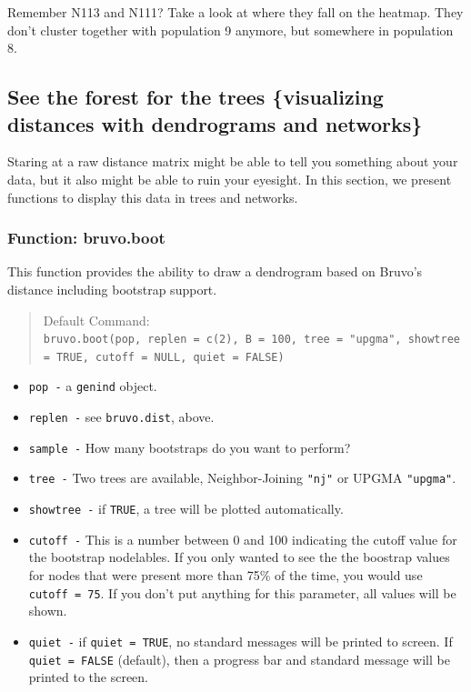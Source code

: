\documentclass[letterpaper]{article}
\newcommand{\tab}{\hspace*{1em}}
\begin{document}
Remember N113 and N111? Take a look at where they fall on the heatmap. They don't cluster together with population 9 anymore, but somewhere in population 8.

\subsection{See the forest for the trees \{visualizing distances with dendrograms and networks\}}\label{index:trees}

\tab\tab Staring at a raw distance matrix might be able to tell you something about your data, but it also might be able to ruin your eyesight. In this section, we present functions to display this data in trees and networks. 

\subsubsection{Function: bruvo.boot}\label{index:trees:bruvo.boot}

\tab\tab This function provides the ability to draw a dendrogram based on Bruvo's distance including bootstrap support. 
\begin{quote}
Default Command:\\
\texttt{bruvo.boot(pop, replen = c(2), B = 100, tree = "upgma", showtree = TRUE, cutoff = NULL, quiet = FALSE)}
\end{quote}
\begin{itemize}
  \item \texttt{pop -} a \texttt{genind} object.
  \item \texttt{replen -} see \texttt{bruvo.dist}, above.
  \item \texttt{sample -} How many bootstraps do you want to perform? 
  \item \texttt{tree -} Two trees are available, Neighbor-Joining \texttt{"nj"} or UPGMA \texttt{"upgma"}.
  \item \texttt{showtree -} if \texttt{TRUE}, a tree will be plotted automatically.
  \item \texttt{cutoff -} This is a number between 0 and 100 indicating the cutoff value for the bootstrap nodelables. If you only wanted to see the the boostrap values for nodes that were present more than 75\% of the time, you would use \texttt{cutoff = 75}. If you don't put anything for this parameter, all values will be shown.
  \item \texttt{quiet -} if \texttt{quiet = TRUE}, no standard messages will be printed to screen. If \texttt{quiet = FALSE} (default), then a progress bar and standard message will be printed to the screen.
\end{itemize}
\end{document}
